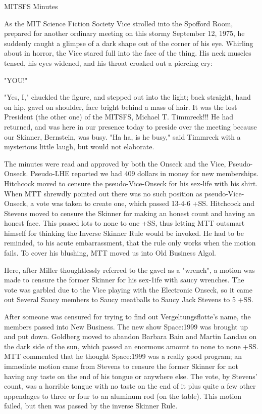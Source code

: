 \documentclass[12pt]{article}
\begin{document}
\begin{center}

MITSFS Minutes

\end{center}
 
\vspace{12pt}

\setlength{\parskip}{6pt}

\noindent
As the MIT Science Fiction Society Vice strolled into the Spofford Room, prepared for another ordinary meeting on this stormy September 12, 1975, he suddenly caught a glimpse of a dark shape out of the corner of his eye. Whirling about in horror, the Vice stared full into the face of the thing. His neck muscles tensed, his eyes widened, and his throat croaked out a piercing cry:

"YOU!"

"Yes, I," chuckled the figure, and stepped out into the light; back straight, hand on hip, gavel on shoulder, face bright behind a mass of hair. It was the lost President (the other one) of the MITSFS, Michael T. Timmreck!!! He had returned, and was here in our presence today to preside over the meeting because our Skinner, Bernstein, was busy. "Ha ha, is he busy," said Timmreck with a mysterious little laugh, but would not elaborate.

The minutes were read and approved by both the Onseck and the Vice, Pseudo-Onseck. Pseudo-LHE reported we had 409 dollars in money for new memberships. Hitchcock moved to censure the pseudo-Vice-Onseck for his sex-life with his shirt. When MTT shrewdly pointed out there was no such position as pseudo-Vice-Onseck, a vote was taken to create one, which passed 13-4-6 +SS. Hitchcock and Stevens moved to censure the Skinner for making an honest count and having an honest face. This passed lots to none to one +SS, thus letting MTT outsmart himself for thinking the Inverse Skinner Rule would be invoked. He had to be reminded, to his acute embarrassment, that the rule only works when the motion fails. To cover his blushing, MTT moved us into Old Business Algol.

Here, after Miller thoughtlessly referred to the gavel as a "wrench", a motion was made to censure the former Skinner for his sex-1ife with saucy wrenches. The vote was garbled due to the Vice playing with the Electronic Onseck, so it came out Several Saucy members to Saucy meatballs to Saucy Jack Stevens to 5 +SS.

After someone was censured for trying to find out Vergeltungsflotte's name, the members passed into New Business. The new show Space:1999 was brought up and put down. Goldberg moved to abandon Barbara Bain and Martin Landau on the dark side of the sun, which passed an enormous amount to none to none +SS. MTT commented that he thought Space:1999 was a really good program; an immediate motion came from Stevens to censure the former Skinner for not having any taste on the end of his tongue or anywhere else. The vote, by Stevens' count, was a horrible tongue with no taste on the end of it plus quite a few other appendages to three or four to an aluminum rod (on the table). This motion failed, but then was passed by the inverse Skinner Rule.
\end{document}
